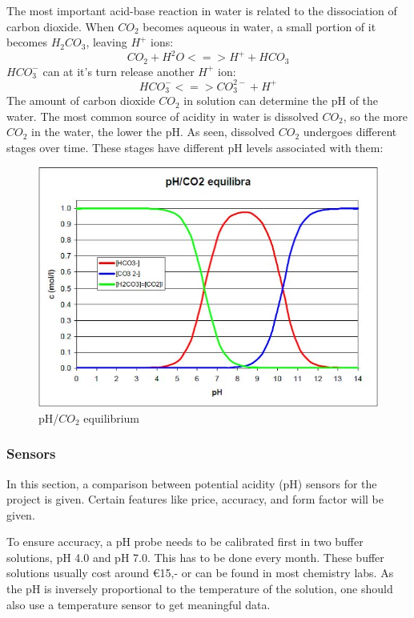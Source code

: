 The most important acid-base reaction in water is related to the dissociation of carbon dioxide. \cite{aes} When $CO_2$ becomes aqueous in water, a small portion of it becomes $H_2CO_3$, leaving $H^+$ ions:
\[CO_2 + H^2O <=> H^+ + HCO_3\]
$HCO_3^-$ can at it's turn release another $H^+$ ion:
\[HCO_3^- <=> CO_3^{2-} + H^+\]
The amount of carbon dioxide $CO_2$ in solution can determine the pH of the water. The most common source of acidity in water is dissolved $CO_2$, so the more $CO_2$ in the water, the lower the pH. As seen, dissolved $CO_2$ undergoes different stages over time. These stages have different pH levels associated with them:

\begin{figure}[h]
\centering
\includegraphics[scale=0.9]{water/21_equilibrium.jpg}
\caption{pH/$CO_2$ equilibrium \cite{aes}}
\end{figure}

\newpage
\subsubsection{Sensors}
In this section, a comparison between potential acidity (pH) sensors for the project is given. Certain features like price, accuracy, and form factor will be given.

To ensure accuracy, a pH probe needs to be calibrated first in two buffer solutions, pH 4.0 and pH 7.0. This has to be done every month. These buffer solutions usually cost around €15,- or can be found in most chemistry labs. As the pH is inversely proportional to the temperature of the solution, one should also use a temperature sensor to get meaningful data.

